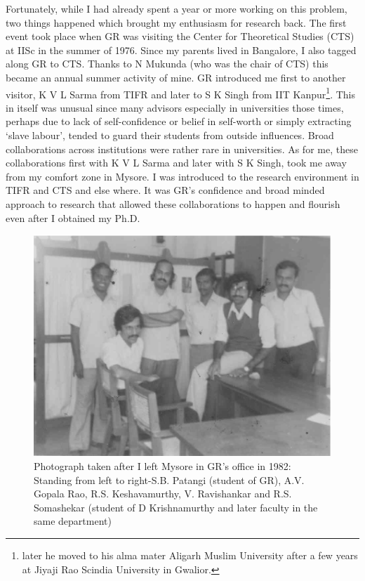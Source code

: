 Fortunately, while I had already spent a year or more working on this problem, two things happened which brought my enthusiasm for research back. The first event took place when GR was visiting the Center for Theoretical Studies (CTS) at IISc in the summer of 1976. Since my parents lived in Bangalore, I also tagged along GR to CTS. Thanks to N Mukunda (who was the chair of CTS) this became an annual summer activity of mine. GR introduced me first to another visitor, K V L Sarma from TIFR and later to S K Singh from IIT Kanpur\footnote{later he moved to his alma mater Aligarh Muslim University after a few years at Jiyaji Rao Scindia University in Gwalior.}. This in itself was unusual since many advisors especially in universities those times, perhaps due to lack of self-confidence or belief in self-worth or simply extracting ‘slave labour’, tended to guard their students from outside influences. Broad collaborations across institutions were rather rare in universities. As for me, these collaborations first with K V L Sarma and later with S K Singh, took me away from my comfort zone in Mysore. I was introduced to the research environment in TIFR and CTS and else where. It was GR’s confidence and broad minded approach to research that allowed these collaborations to happen and flourish even after I obtained my Ph.D.
\begin{figure}[H]
\centering
\includegraphics[scale=.8]{src/images/chap14/002.eps}
\caption{Photograph taken after I left Mysore in GR’s office in 1982: Standing from left to right-S.B. Patangi (student of GR), A.V. Gopala Rao, R.S. Keshavamurthy, V. Ravishankar and R.S. Somashekar (student of D Krishnamurthy and later faculty in the same department)}\label{chap14-fig002}
\end{figure}

